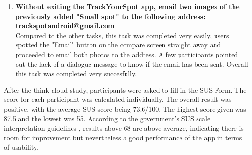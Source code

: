 \begin{enumerate}
    \item \textbf{Without exiting the TrackYourSpot app, email two images of the previously added "Small spot" to the following address: trackspotandroid@gmail.com}
    \\ Compared to the other tasks, this task was completed very easily, users spotted the "Email" button on the compare screen straight away and proceeded to email both photos to the address. A few participants pointed out the lack of a dialogue message to know if the email has been sent. Overall this task was completed very succesfully.
\end{enumerate}

After the think-aloud study, participants were asked to fill in the SUS Form. The score for each participant was calculated individually. The overall result was positive, with the average SUS score being 73.6/100. The highest score given was 87.5 and the lowest was 55. According to the government's SUS scale interpretation guidelines \cite{affairs_2013}, results above 68 are above average, indicating there is room for improvement but nevertheless a good performance of the app in terms of usability.


